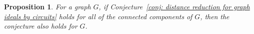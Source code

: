 \documentclass[a4paper, 12pt]{article}
\newcommand{\ZZ}{\mathbb Z}
\theoremstyle{plain}
\newtheorem{proposition}[theorem]{Proposition}
\theoremstyle{definition}
\theoremstyle{remark}
\begin{document}


     





\begin{proposition} \label{prop:conjccs}
    For a graph $G$, if Conjecture~\ref{conj: distance reduction for graph ideals by circuits} holds for all of the connected components of $G$, then the conjecture also holds for $G$.
\end{proposition}



\end{document}
